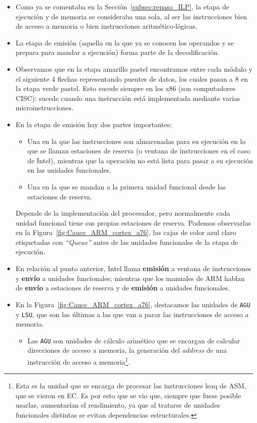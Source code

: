 \begin{itemize}
    \item Como ya se comentaba en la Sección~\ref{subsec:repaso_ILP}, la etapa de ejecución y de memoria se consideraba una sola, al ser las instrucciones bien de acceso a memoria o bien instrucciones aritmético-lógicas.
    \item La etapa de emisión (aquella en la que ya se conocen los operandos y se prepara para mandar a ejecución) forma parte de la decodificación.
    \item Observamos que en la etapa amarillo pastel encontramos entre cada módulo y el siguiente 4 flechas representando puentes de datos, los cuales pasan a 8 en la etapa verde pastel. Esto sucede siempre en los x86 (son computadores CISC): sucede cuando una instrucción está implementada mediante varias microinstrucciones.
    \item En la etapa de emisión hay dos partes importantes:
        \begin{itemize}
            \item Una en la que las instrucciones son almacenadas para su ejecución en lo que se llaman estaciones de reserva (o ventana de instrucciones en el caso de Intel), mientras que la operación no está lista para pasar a su ejecución en las unidades funcionales.
            \item Una en la que se mandan a la primera unidad funcional desde las estaciones de reserva.
        \end{itemize}
        Depende de la implementación del procesador, pero normalmente cada unidad funcional tiene sus propias estaciones de reserva. Podemos observarlas en la Figura~\ref{fig:Cauce_ARM_cortex_a76}, las cajas de color azul claro etiquetadas con \emph{``Queue''} antes de las unidades funcionales de la etapa de ejecución.
    \item En relación al punto anterior, Intel llama \textbf{emisión} a ventana de instrucciones y \textbf{envío} a unidades funcionales; mientras que los manuales de ARM hablan de \textbf{envío} a estaciones de reserva y de \textbf{emisión} a unidades funcionales.
    \item En la Figura~\ref{fig:Cauce_ARM_cortex_a76}, destacamos las unidades de \verb|AGU| y \verb|LSU|, que son las últimas a las que van a parar las instrucciones de acceso a memoria.
        \begin{itemize}
            \item Las \verb|AGU| son unidades de cálculo arimético que se encargan de calcular direcciones de acceso a memoria, la generación del \emph{address} de una instrucción de acceso a memoria\footnote{Esta es la unidad que se encarga de procesar las instrucciones leaq de ASM, que se vieron en EC. Es por esto que se vio que, siempre que fuese posible usarlas, aumentarían el rendimiento, ya que al tratarse de unidades funcionales distintas se evitan dependencias estructurales.}.

\end{itemize}
\end{itemize}
